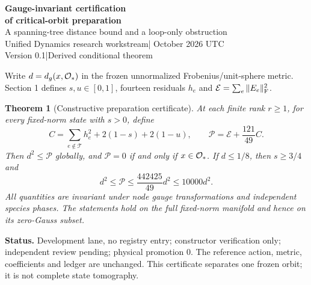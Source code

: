 \documentclass[11pt,a4paper]{article}
\newtheorem{theorem}{Theorem}\newtheorem{lemma}[theorem]{Lemma}\newtheorem{corollary}[theorem]{Corollary}
\begin{document}
\begin{center}
{\Large\bfseries Gauge-invariant certification\\of critical-orbit preparation}\\[9pt]
{\large A spanning-tree distance bound and a loop-only obstruction}\\[9pt]
Unified Dynamics research workstream\quad | October 2026 UTC\\
Version 0.1\quad |\quad Derived conditional theorem
\end{center}
\begin{abstract}
We give a global, constructive upper bound on distance to the frozen neutral critical orbit of the finite tetrahedral gauge model. The bound uses 27 real gauge-invariant scalars, including electric energy, full cycle traces and transported matter coherences. It vanishes exactly on that orbit and has an explicit local conditioning bound. Rational interval inputs can therefore certify entry into the earlier nonlinear trapping ball without assuming beforehand that the state is in its local chart. Conversely, active matter-dressed loops cannot certify full preparation: zero-Gauss electric perturbations are invisible instantaneously at every rank, and unused-color dynamics remain invisible for all time at rank at least two. The measurement contract is mathematical and conditional; no experimental realization or physical correspondence is claimed.
\end{abstract}
Write $d=d_g(x,\mathcal O_*)$ in the frozen unnormalized Frobenius/unit-sphere metric. Section 1 defines $s,u\in[0,1]$, fourteen residuals $h_e$ and $\mathcal E=\sum_e\|E_e\|_\mathrm F^2$.
\begin{theorem}[Constructive preparation certificate]\label{th:main}
At each finite rank $r\ge1$, for every fixed-norm state with $s>0$, define
\[
C=\sum_{e\notin\mathcal T}h_e^2+2(1-s)+2(1-u),\qquad
\boxed{\mathcal P=\mathcal E+\frac{121}{49}C.}
\]
Then $d^2\le\mathcal P$ globally, and $\mathcal P=0$ if and only if $x\in\mathcal O_*$. If $d\le1/8$, then $s\ge3/4$ and
\[
\boxed{d^2\le\mathcal P\le\frac{442425}{49}d^2\le10000d^2.}
\]
All quantities are invariant under node gauge transformations and independent species phases. The statements hold on the full fixed-norm manifold and hence on its zero-Gauss subset.
\end{theorem}
\textbf{Status.} Development lane, no registry entry; constructor verification only; independent review pending; physical promotion $0$. The reference action, metric, coefficients and ledger are unchanged. This certificate separates one frozen orbit; it is not complete state tomography.
\newpage
\end{document}
